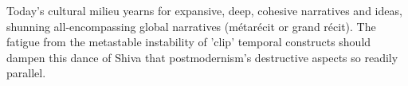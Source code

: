 \documentclass[11pt,a4]{article}
\begin{document}
    Today's cultural
    milieu yearns for expansive, deep, cohesive narratives and ideas, shunning all-encompassing
    global narratives (métarécit or grand récit). The fatigue from the metastable
    instability of 'clip' temporal constructs should dampen this dance of Shiva that
    postmodernism's destructive aspects so readily parallel.





\end{document}
